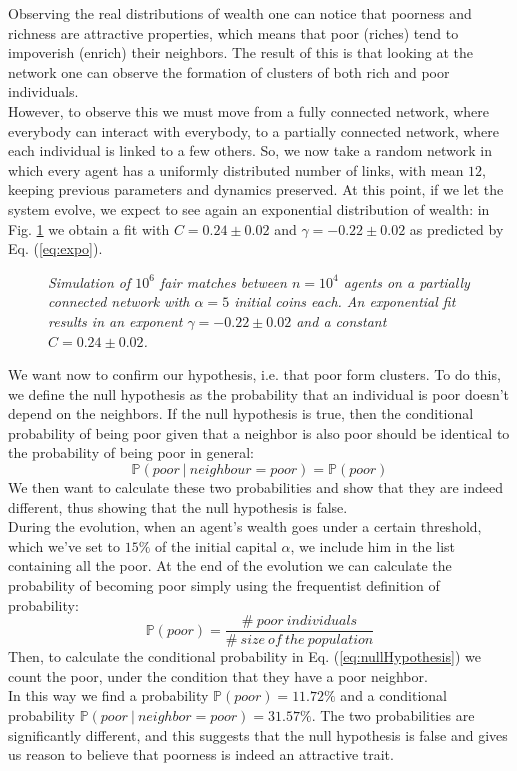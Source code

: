 Observing the real distributions of wealth one can notice that poorness and richness are attractive properties, which means that poor (riches) tend to impoverish (enrich) their neighbors.
The result of this is that looking at the network one can observe the formation of clusters of both rich and poor individuals. \\
However, to observe this we must move from a fully connected network, where everybody can interact with everybody, to a partially connected network, where each individual is linked to a few others.
So, we now take a random network in which every agent has a uniformly distributed number of links, with mean $12$, keeping previous parameters and dynamics preserved.
At this point, if we let the system evolve, we expect to see again an exponential distribution of wealth: in Fig. \ref{fig:fixedExpo} we obtain a fit with $C = 0.24 \pm 0.02$ and $\gamma = -0.22 \pm 0.02$ as predicted by Eq. (\ref{eq:expo}).
\begin{figure}[H]
    \centering
    \scalebox{.7}{}
    \caption{\emph{Simulation of $10^6$ fair matches between $n = 10^4$ agents on a partially connected network with $\alpha = 5$ initial coins each. 
                    An exponential fit results in an exponent $\gamma = -0.22 \pm 0.02$ and a constant $C = 0.24 \pm 0.02$.}}
    \label{fig:fixedExpo}
\end{figure}
We want now to confirm our hypothesis, i.e. that poor form clusters.
To do this, we define the null hypothesis as the probability that an individual is poor doesn't depend on the neighbors.
If the null hypothesis is true, then the conditional probability of being poor given that a neighbor is also poor should be identical to the probability of being poor in general:
\begin{equation}
    \mathbb{P}(poor \ | \ neighbour=poor) = \mathbb{P}(poor)
	\label{eq:nullHypothesis}
\end{equation}
We then want to calculate these two probabilities and show that they are indeed different, thus showing that the null hypothesis is false. \\
During the evolution, when an agent's wealth goes under a certain threshold, which we've set to $15 \%$ of the initial capital $\alpha$, we include him in the list containing all the poor.
At the end of the evolution we can calculate the probability of becoming poor simply using the frequentist definition of probability:
\begin{equation*}
	\mathbb{P}(poor) = \frac{\# \ poor \ individuals}{\# \ size \ of \ the \ population}   
\end{equation*}
Then, to calculate the conditional probability in Eq. (\ref{eq:nullHypothesis}) we count the poor, under the condition that they have a poor neighbor. \\
In this way we find a probability $\mathbb{P}(poor) = 11.72 \%$ and a conditional probability $\mathbb{P}(poor \ | \ neighbor=poor) = 31.57 \%$.
The two probabilities are significantly different, and this suggests that the null hypothesis is false and gives us reason to believe that poorness is indeed an attractive trait.
